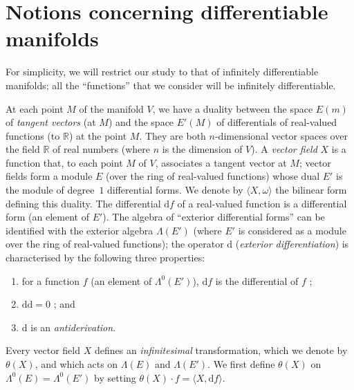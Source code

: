 \documentclass{article}
\newcommand{\dd}{\mathrm{d}}
\newcommand{\RR}{\mathbb{R}}
\newcommand{\oldpage}[1]{\marginpar{\footnotesize$\Big\vert$ \textit{p.~#1}}}
\begin{document}
\section{Notions concerning differentiable manifolds}
\label{I.4}

For simplicity, we will restrict our study to that of infinitely differentiable manifolds;
all the ``functions'' that we consider will be infinitely differentiable.

\oldpage{9}
At each point $M$ of the manifold $V$, we have a duality between the space $E(m)$ of \emph{tangent vectors} (at $M$) and the space $E'(M)$ of differentials of real-valued functions (to $\RR$) at the point $M$.
They are both $n$-dimensional vector spaces over the field $\RR$ of real numbers (where $n$ is the dimension of $V$).
A \emph{vector field} $X$ is a function that, to each point $M$ of $V$, associates a tangent vector at $M$;
vector fields form a module $E$ (over the ring of real-valued functions) whose dual $E'$ is the module of degree~$1$ differential forms.
We denote by $\langle X,\omega\rangle$ the bilinear form defining this duality.
The differential $\dd f$ of a real-valued function is a differential form (an element of $E'$).
The algebra of ``exterior differential forms'' can be identified with the exterior algebra $\Lambda(E')$ (where $E'$ is considered as a module over the ring of real-valued functions);
the operator $\dd$ (\emph{exterior differentiation}) is characterised by the following three properties:
\begin{enumerate}[1)]
  \item for a function $f$ (an element of $\Lambda^0(E')$), $\dd f$ is the differential of $f$ ;
  \item $\dd\dd=0$ ; and
  \item $\dd$ is an \emph{antiderivation}.
\end{enumerate}

Every vector field $X$ defines an \emph{infinitesimal} transformation, which we denote by $\theta(X)$, and which acts on $\Lambda(E)$ and $\Lambda(E')$.
We first define $\theta(X)$ on $\Lambda^0(E)=\Lambda^0(E')$ by setting $\theta(X)\cdot f=\langle X,\dd f\rangle$.




\nocite{*}
\end{document}
